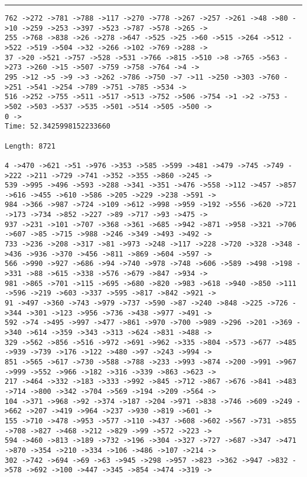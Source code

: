 \documentclass[letter, 12pt]{article}
\newenvironment{question}[1]{%
    \vspace{.2in}%
        \noindent{\bf #1}%
    \vspace{0.3em} \hrule \vspace{.1in}%
}{}
\begin{document}
\begin{question}{\large Appendix}
\begin{lstlisting}[style=CStyle]
762 ->272 ->781 ->788 ->117 ->270 ->778 ->267 ->257 ->261 ->48 ->80 ->10 ->259 ->253 ->397 ->523 ->787 ->578 ->265 ->
255 ->768 ->838 ->26 ->278 ->647 ->525 ->25 ->60 ->515 ->264 ->512 ->522 ->519 ->504 ->32 ->266 ->102 ->769 ->288 ->
37 ->20 ->521 ->757 ->528 ->531 ->766 ->815 ->510 ->8 ->765 ->563 ->273 ->260 ->15 ->507 ->759 ->758 ->764 ->4 ->
295 ->12 ->5 ->9 ->3 ->262 ->786 ->750 ->7 ->11 ->250 ->303 ->760 ->251 ->541 ->254 ->789 ->751 ->785 ->534 ->
516 ->252 ->755 ->511 ->517 ->513 ->752 ->506 ->754 ->1 ->2 ->753 ->502 ->503 ->537 ->535 ->501 ->514 ->505 ->500 ->
0 ->
Time: 52.3425998152233660

Length: 8721

4 ->470 ->621 ->51 ->976 ->353 ->585 ->599 ->481 ->479 ->745 ->749 ->222 ->211 ->729 ->741 ->352 ->355 ->860 ->245 ->
539 ->995 ->496 ->593 ->288 ->341 ->351 ->476 ->558 ->112 ->457 ->857 ->616 ->455 ->610 ->586 ->205 ->229 ->238 ->591 ->
984 ->366 ->987 ->724 ->109 ->612 ->998 ->959 ->192 ->556 ->620 ->721 ->173 ->734 ->852 ->227 ->89 ->717 ->93 ->475 ->
937 ->231 ->101 ->707 ->368 ->361 ->685 ->942 ->871 ->958 ->321 ->706 ->607 ->85 ->715 ->988 ->246 ->349 ->493 ->492 ->
733 ->236 ->208 ->317 ->81 ->973 ->248 ->117 ->228 ->720 ->328 ->348 ->436 ->936 ->370 ->456 ->811 ->869 ->604 ->597 ->
566 ->990 ->927 ->686 ->94 ->740 ->978 ->748 ->606 ->589 ->498 ->198 ->331 ->88 ->615 ->338 ->576 ->679 ->847 ->934 ->
981 ->865 ->701 ->115 ->695 ->680 ->820 ->983 ->618 ->940 ->850 ->111 ->596 ->219 ->603 ->337 ->595 ->817 ->842 ->921 ->
91 ->497 ->360 ->743 ->979 ->737 ->590 ->87 ->240 ->848 ->225 ->726 ->344 ->301 ->123 ->956 ->736 ->438 ->977 ->491 ->
592 ->74 ->495 ->997 ->477 ->861 ->970 ->700 ->989 ->296 ->201 ->369 ->340 ->614 ->359 ->343 ->313 ->624 ->831 ->488 ->
329 ->562 ->856 ->516 ->972 ->691 ->962 ->335 ->804 ->573 ->677 ->485 ->939 ->739 ->176 ->122 ->480 ->97 ->243 ->994 ->
851 ->565 ->617 ->730 ->588 ->788 ->233 ->993 ->874 ->200 ->991 ->967 ->999 ->552 ->966 ->182 ->316 ->339 ->863 ->623 ->
217 ->464 ->332 ->183 ->333 ->992 ->845 ->712 ->867 ->676 ->841 ->483 ->714 ->800 ->342 ->704 ->569 ->194 ->209 ->564 ->
104 ->371 ->968 ->92 ->374 ->187 ->204 ->971 ->838 ->746 ->609 ->249 ->662 ->207 ->419 ->964 ->237 ->930 ->819 ->601 ->
155 ->710 ->478 ->953 ->577 ->110 ->437 ->608 ->602 ->567 ->731 ->855 ->708 ->827 ->468 ->212 ->829 ->99 ->572 ->223 ->
594 ->460 ->813 ->189 ->732 ->196 ->304 ->327 ->727 ->687 ->347 ->471 ->870 ->354 ->210 ->334 ->106 ->486 ->107 ->214 ->
302 ->742 ->694 ->69 ->63 ->945 ->298 ->957 ->823 ->362 ->947 ->832 ->578 ->692 ->100 ->447 ->345 ->854 ->474 ->319 ->

\end{lstlisting}
\end{question}
\end{document}

